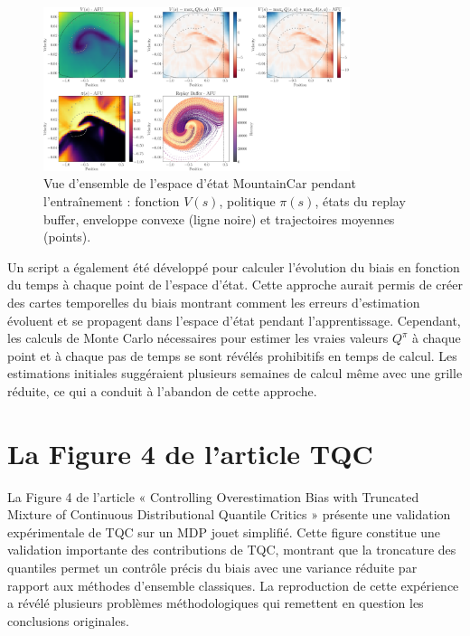 \documentclass[a4paper, 12pt]{report}
\begin{document}
    \begin{figure}[htbp]
        \centering
        \includegraphics[width=0.8\textwidth]{../figures/afu_mountaincar_critic_policy/scaled_02000.png}
        \caption{Vue d'ensemble de l'espace d'état MountainCar pendant l'entraînement : fonction $V(s)$, politique $\pi(s)$, états du replay buffer, enveloppe convexe (ligne noire) et trajectoires moyennes (points).}
        \label{fig:mountaincar-overview}
    \end{figure}
    
    Un script a également été développé pour calculer l'évolution du biais en
    fonction du temps à chaque point de l'espace d'état. Cette approche aurait
    permis de créer des cartes temporelles du biais montrant comment les
    erreurs d'estimation évoluent et se propagent dans l'espace d'état pendant
    l'apprentissage. Cependant, les calculs de Monte Carlo nécessaires pour
    estimer les vraies valeurs $Q^\pi$ à chaque point et à chaque pas de temps se
    sont révélés prohibitifs en temps de calcul. Les estimations
    initiales suggéraient plusieurs semaines de calcul même avec une grille
    réduite, ce qui a conduit à l'abandon de cette approche.

    \section{La Figure 4 de l'article TQC}

    La Figure 4 de l'article « Controlling Overestimation Bias with Truncated
    Mixture of Continuous Distributional Quantile Critics »
    \cite{kuznetsov2020controllingoverestimationbiastruncated} présente une
    validation expérimentale de TQC sur un MDP jouet simplifié. Cette figure
    constitue une validation importante des contributions de TQC, montrant que
    la troncature des quantiles permet un contrôle précis du biais avec une
    variance réduite par rapport aux méthodes d'ensemble classiques. La
    reproduction de cette expérience a révélé plusieurs problèmes
    méthodologiques qui remettent en question les conclusions originales.
\end{document}
